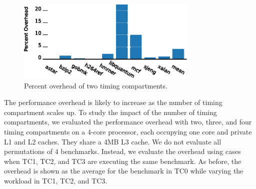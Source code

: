 \begin{figure}
   \begin{center}
       \includegraphics[width=3.4in]{figs/two_tcs.eps}
       \caption{Percent overhead of two timing compartments.}
       \label{fig:two_tc_overhead}
   \end{center}
\end{figure}



The performance overhead is likely to increase as the number of timing 
compartment scales up. To study the impact of the number of timing 
compartments, we evaluated the performance overhead with two, three, and four 
timing compartments on a 4-core  processor, each occupying one core and private 
L1 and L2 caches. They share a 4MB L3 cache. We do not evaluate all 
permutations of 4 benchmarks. Instead, we evaluate the overhead using cases
when TC1, TC2, and TC3 are executing the same benchmark. As 
before, the overhead is shown as the average for the benchmark in TC0 while
varying the workload in TC1, TC2, and TC3.

